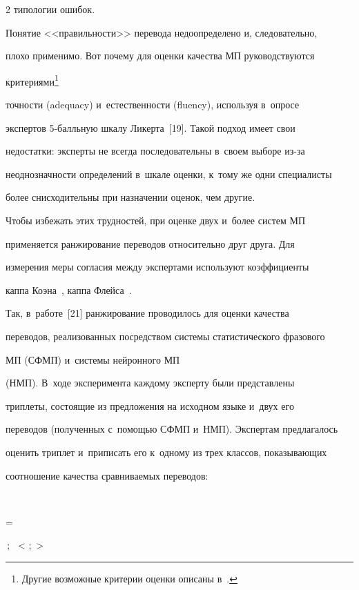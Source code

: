 \begin{multicols}{2}
типологии ошибок.


  


  Понятие <<правильности>> перевода недоопределено и, следовательно, 


плохо применимо. Вот почему для оценки качества МП руководствуются 


критериями\footnote{Другие возможные критерии оценки описаны в~\cite{18-nur}.} 


точности (adequacy) и~естественности (fluency), используя в~опросе 


экспертов 5-балль\-ную шкалу Ликерта~[19]. Такой подход имеет свои 


недостатки: эксперты не всегда последовательны в~своем выборе из-за 


неоднозначности определений в~шкале оценки, к~тому же одни специалисты 


более снисходительны при назначении оценок, чем другие.


  


  Чтобы избежать этих трудностей, при оценке двух и~более систем МП 


применяется ранжирование переводов относительно друг друга. Для 


измерения меры согласия между экспертами используют коэффициенты 


каппа Коэна~\cite[с.~48]{10-nur}, каппа Флейса~\cite{20-nur}.


  


  Так, в~работе~[21] ранжирование проводилось для оценки качества 


переводов, реализованных посредством системы статистического фразового 


МП (СФМП) и~системы нейронного МП


(НМП). В~ходе эксперимента каждому эксперту были представлены 


триплеты, состоящие из предложения на исходном языке и~двух его 


переводов (полученных с~помощью СФМП и~НМП). Экспертам предлагалось 


оценить триплет и~приписать его к~одному из трех классов, показывающих 


соотношение качества сравниваемых переводов: 


$$


 = 


\,;\   <  ;\  > 



\end{multicols}
